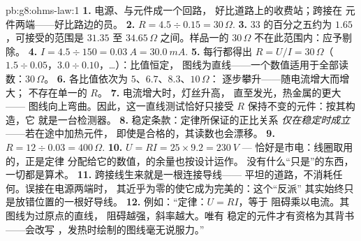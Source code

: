 \begin{solution}{pb:g8:ohms-law:1}
\textbf{1.} 电源、与元件成一个回路，
好比道路上的收费站；跨接在
元件两端——好比路边的员。
\textbf{2.} $R = 4.5 \div 0.15 = 30\,\Omega$.
\textbf{3.} $33$ 的百分之五约为 $1.65$，可接受的范围是
$31.35$ 至 $34.65\,\Omega$ 之间。样品一的 $30\,\Omega$
不在此范围内：应予剔除。
\textbf{4.} $I = 4.5 \div 150 = \qty{0.03}{A} =
\qty{30.0}{mA}$.
\textbf{5.} 每行都得出 $R = U/I = 30\,\Omega$（$1.5
\div 0.05$，$3.0 \div 0.10$，\dots）：比值恒定，
图线为直线——一个数值适用于全部读数：$30\,\Omega$。
\textbf{6.} 各比值依次为 $5$、$6.7$、$8.3$、$10\,\Omega$：
逐步攀升——随电流增大而增大；
不存在单一的 $R$。
\textbf{7.} 电流增大时，灯丝升高，
直至发光，热金属的更大——
图线向上弯曲。因此，这一直线测试恰好只接受
$R$ 保持不变的元件：按其构造，它
就是一台检测器。
\textbf{8.} 稳定条款：定律所保证的正比关系
\emph{仅在稳定时成立}——若在途中加热元件，
即使是合格的，其读数也会漂移。
\textbf{9.} $R = 12 \div 0.03 = 400\,\Omega$.
\textbf{10.} $U = R I = 25 \times 9.2 = \qty{230}{V}$ ---
恰好是市电：线圈取用的，正是定律
分配给它的数值，的余量也按设计运作。
没有什么“只是”的东西，一切都是算术。
\textbf{11.} 跨接线生来就是一根连接导线——
平坦的道路，不消耗任何。误接在电源两端时，
其近乎为零的使它成为完美的：这个“反派”
其实始终只是放错位置的一根好导线。
\textbf{12.} 例如：“定律：$U = R I$，等于
阻碍乘以电流。其图线为过原点的直线，
阻碍越强，斜率越大。唯有
稳定的元件才有资格为其背书——会改写
，发热时绘制的图线毫无说服力。”
\end{solution}
